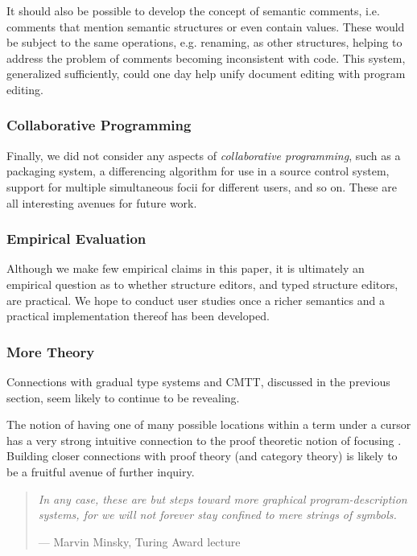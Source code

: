 \documentclass[9pt]{sigplanconf}
\begin{document}
It should also be possible to develop the concept of semantic comments,
i.e. comments that mention semantic structures or even contain values. These would be subject to
the same operations, e.g. renaming, as other structures, helping to address
the problem of comments becoming inconsistent with code. This system, generalized sufficiently,
could one day help unify document editing with program editing.

\subsubsection{Collaborative Programming}
Finally, we did not consider any aspects of \emph{collaborative
programming}, such as a packaging system, a differencing algorithm for use
in a source control system, support for multiple simultaneous focii for
different users, and so on. These are all interesting avenues for future
work.

\subsubsection{Empirical Evaluation}
Although we make few empirical claims in this paper, it is ultimately an
empirical question as to whether structure editors, and typed structure
editors, are practical. We hope to conduct user studies once a richer
semantics and a practical implementation thereof has been developed.

\subsubsection{More Theory}
Connections with gradual type systems and CMTT, discussed in the previous
section, seem likely to continue to be revealing.

The notion of having one of many possible locations within a term under a
cursor has a very strong intuitive connection to the proof theoretic notion
of focusing \cite{Simmons11tr}. Building closer connections with proof
theory (and category theory) is likely to be a fruitful avenue of further
inquiry.

\begin{quote}
\emph{In any case, these are but steps toward more graphical program-description
systems, for we will not forever stay confined to mere strings of symbols.}

--- Marvin Minsky, Turing Award lecture \cite{DBLP:journals/jacm/Minsky70}
\end{quote}

\acks


\balance



% 
\end{document}
